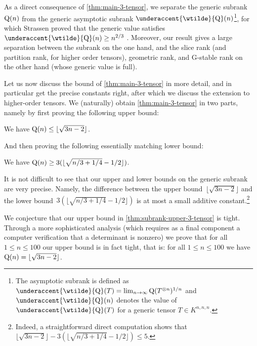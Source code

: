 \documentclass[10pt,a4paper]{article}
\theoremstyle{definition}
\theoremstyle{remark}
\newcommand{\subrank}{{\rm Q}}
\newcommand{\gensubrank}{{\rm Q}}
\DeclareMathOperator{\asympsubrank}{\underaccent{\wtilde}{Q}}
\begin{document}
As a direct consequence of \autoref{thm:main-3-tensor}, we separate the generic subrank~$\gensubrank(n)$ from the generic asymptotic subrank $\asympsubrank(n)$\footnote{The asymptotic subrank is defined as $\asympsubrank(T) = \lim_{n\to\infty} \subrank(T^{\otimes n})^{1/n}$ and $\asympsubrank(n)$ denotes the value of $\asympsubrank(T)$ for a generic tensor $T \in K^{n,n,n}$.}, for which Strassen proved that the generic value satisfies~$\asympsubrank(n) \geq n^{2/3}$ \cite[Prop.~3.6]{strassen1988asymptotic}. Moreover, our result gives a large separation between the subrank on the one hand, and the slice rank (and partition rank, for higher order tensors), geometric rank, and G-stable rank on the other hand (whose generic value is full).

Let us now discuss the bound of \autoref{thm:main-3-tensor} in more detail, and in particular get the precise constants right, after which we discuss the extension to higher-order tensors.
We (naturally) obtain \autoref{thm:main-3-tensor} in two parts, namely by first proving the following upper bound:

\begin{theorem} \label{thm:subrank-upper-3-tensor}
%
We have 
$\gensubrank(n) \leq \lfloor\sqrt{3n-2}\rfloor$.
\end{theorem}

And then proving the following essentially matching lower bound:

\begin{theorem}\label{thm:subrank-lower-3-tensor}
We have $\gensubrank(n) \geq 3(\lfloor\sqrt{n/3 + 1/4}-1/2\rfloor)$.
\end{theorem}

%
It is not difficult to see that our upper and lower bounds on the generic subrank are very precise. Namely, 
the difference between the upper bound~$\lfloor\sqrt{3n-2}\rfloor$ 
and the lower bound~$3(\lfloor\sqrt{n/3 + 1/4}-1/2\rfloor)$ 
is at most a small additive constant.\footnote{Indeed, a straightforward direct computation shows that  $\lfloor\sqrt{3n-2}\rfloor - 3(\lfloor\sqrt{n/3 + 1/4}-1/2\rfloor) \leq 5$.}

We conjecture that our upper bound in \autoref{thm:subrank-upper-3-tensor} is tight.
Through a more sophisticated analysis (which requires as a final component a computer verification that a determinant is nonzero) we prove that for all $1\leq n \leq 100$ our upper bound is in fact tight, that is: for all $1 \leq n \leq 100$ we have $\gensubrank(n) = \lfloor\sqrt{3n-2}\rfloor$. 
\end{document}
